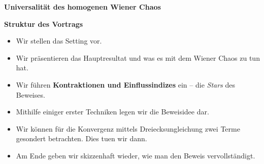 \documentclass[11pt, ngerman]{scrartcl}
\theoremstyle{definition}
\theoremstyle{plain}
\newcommand{\<}{\langle}
\renewcommand{\>}{\rangle}
\begin{document}
\begin{center}

\vspace{0,25cm}

    \large{\textbf{Universalität des homogenen Wiener Chaos}}\\
\end{center}
\vspace{0,25cm}
\textbf{Struktur des Vortrags}
\begin{itemize}
    \item Wir stellen das Setting vor.
    \item Wir präsentieren das Hauptresultat und was es mit dem Wiener Chaos zu tun hat.
    \item Wir führen \textbf{Kontraktionen und Einflussindizes} ein -- die \textit{Stars} des Beweises.
    \item Mithilfe einiger erster Techniken legen wir die Beweisidee dar. 
    \item Wir können für die Konvergenz mittels Dreiecksungleichung zwei Terme gesondert betrachten. Dies tuen wir dann. 
    \item Am Ende geben wir skizzenhaft wieder, wie man den Beweis vervollständigt.
    \end{itemize}
\end{document}
